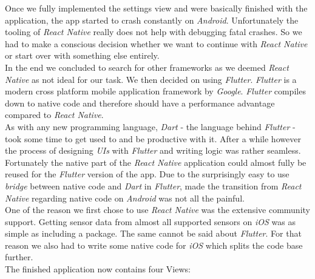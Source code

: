 \documentclass{article}
\begin{document}
  Once we fully implemented the settings view and were basically finished with the application, the app started to crash constantly on \textit{Android}. Unfortunately the tooling of \textit{React Native} really does not help with debugging fatal crashes. So we had to make a conscious decision whether we want to continue with \textit{React Native} or start over with something else entirely. \\
  In the end we concluded to search for other frameworks as we deemed \textit{React Native} as not ideal for our task. We then decided on using \textit{Flutter}. \textit{Flutter} is a modern cross platform mobile application framework by \textit{Google}. \textit{Flutter} compiles down to native code and therefore should have a performance advantage compared to \textit{React Native}. \\
  As with any new programming language, \textit{Dart} - the language behind \textit{Flutter} - took some time to get used to and be productive with it. After a while however the process of designing \textit{UIs} with \textit{Flutter} and writing logic was rather seamless. Fortunately the native part of the \textit{React Native} application could almost fully be reused for the \textit{Flutter} version of the app. Due to the surprisingly easy to use \textit{bridge} between native code and \textit{Dart} in \textit{Flutter}, made the transition from \textit{React Native} regarding native code on \textit{Android} was not all the painful. \\
  One of the reason we first chose to use \textit{React Native} was the extensive community support. Getting sensor data from almost all supported sensors on \textit{iOS} was as simple as including a package. The same cannot be said about \textit{Flutter}. For that reason we also had to write some native code for \textit{iOS} which splits the code base further. \\

  The finished application now contains four Views:
\end{document}
